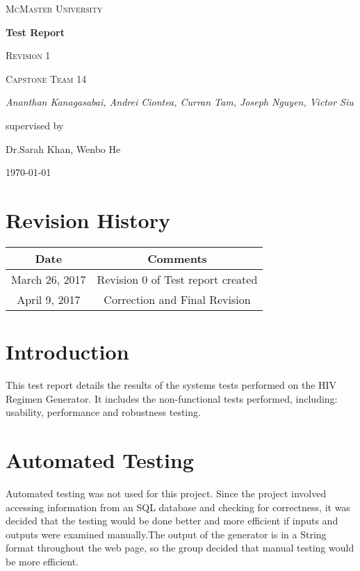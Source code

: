 \documentclass[12pt]{article}
\begin{document}
\begin{titlepage}
	\centering
	{\scshape\LARGE McMaster University \par}
	\vspace{1.5cm}
	{\huge\bfseries Test Report \par}
	{\scshape\Large Revision 1 \par}

	\vspace{1cm}
	{\scshape\Large Capstone Team 14\par}
	{\Large\itshape Ananthan Kanagasabai, Andrei Ciontea, Curran Tam, Joseph Nguyen, Victor Siu \par}
	\vspace{3cm}
	\vfill
	supervised by\par
	Dr.Sarah Khan, Wenbo He

	\vfill
	{\large \today\par}
\end{titlepage}

\newpage
\tableofcontents


\section*{Revision History}
\begin{tabular}{|c|c|}
\hline
\textbf{Date}  & \textbf{Comments} \\ \hline
March 26, 2017 & Revision 0 of Test report created \\ 
\hline
April 9, 2017 & Correction and Final Revision\\
\hline
\end{tabular}

\newpage
\section{Introduction}
This test report details the results of the systems tests performed on the HIV Regimen Generator. It includes the non-functional tests performed, including: usability, performance and robustness testing.

\section{Automated Testing}
Automated testing was not used for this project. Since the project involved accessing information from an SQL database and checking for correctness, it was decided that the testing would be done better and more efficient if inputs and outputs were examined manually.The output of the generator is in a String format throughout the web page, so the group decided that manual testing would be more efficient.
\end{document}
